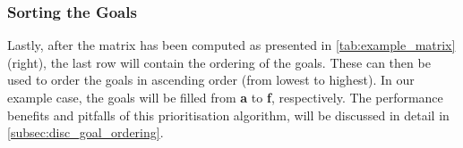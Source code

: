 \subsubsection{Sorting the Goals}
Lastly, after the matrix has been computed as presented in \cref{tab:example_matrix} (right), the last row will contain the ordering of the goals.
These can then be used to order the goals in ascending order (from lowest to highest).
In our example case, the goals will be filled from \textbf{a} to \textbf{f}, respectively.
The performance benefits and pitfalls of this prioritisation algorithm, will be discussed in detail in \cref{subsec:disc_goal_ordering}.
%





